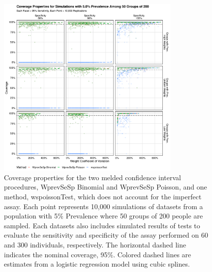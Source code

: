 \documentclass[AMA,STIX1COL]{WileyNJD-v2}
\begin{document}
\begin{figure}
\centering
\includegraphics[width=0.8\textwidth]{figures/imperfect_coverage_50_groups_0_05_prev.pdf}
\caption{Coverage properties for the two melded confidence interval procedures, WprevSeSp Binomial and WprevSeSp Poisson, and one method, wspoissonTest, which does not account for the imperfect assay.
Each point represents 10,000 simulations of datasets from a population with 5\% Prevalence where 50 groups of 200 people are sampled.
Each datasets also includes simulated results of tests to evaluate the sensitivity and specificity of the assay performed on 60 and 300 individuals, respectively.
The horizontal dashed line indicates the nominal coverage, 95\%.
Colored dashed lines are estimates from a logistic regression model using cubic splines.}
\label{fig:imperfect_coverage_50_groups_0_05_prev}
\end{figure}
\end{document}
